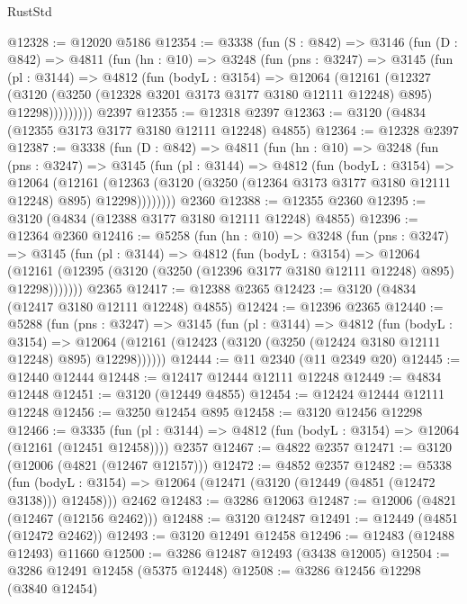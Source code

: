 \begin{lexlean}{RustStd}
\begin{coremodule}
{\begin{coremodule}
{{{{{{{{{{{{{{{{{{{{{{{{{{@12328 := @12020 @5186
@12354 := @3338
    (fun (S : @842) =>
    @3146
      (fun (D : @842) =>
      @4811
        (fun (hn : @10) =>
        @3248
          (fun (pns : @3247) =>
          @3145
            (fun (pl : @3144) =>
            @4812
              (fun (bodyL : @3154) =>
              @12064
                (@12161
                  (@12327
                    (@3120
                      (@3250 (@12328 @3201 @3173 @3177 @3180 @12111 @12248) @895)
                      @12298)))))))))
    @2397
@12355 := @12318 @2397
@12363 := @3120 (@4834 (@12355 @3173 @3177 @3180 @12111 @12248) @4855)
@12364 := @12328 @2397
@12387 := @3338
    (fun (D : @842) =>
    @4811
      (fun (hn : @10) =>
      @3248
        (fun (pns : @3247) =>
        @3145
          (fun (pl : @3144) =>
          @4812
            (fun (bodyL : @3154) =>
            @12064
              (@12161
                (@12363 (@3120 (@3250 (@12364 @3173 @3177 @3180 @12111 @12248) @895) @12298))))))))
    @2360
@12388 := @12355 @2360
@12395 := @3120 (@4834 (@12388 @3177 @3180 @12111 @12248) @4855)
@12396 := @12364 @2360
@12416 := @5258
    (fun (hn : @10) =>
    @3248
      (fun (pns : @3247) =>
      @3145
        (fun (pl : @3144) =>
        @4812
          (fun (bodyL : @3154) =>
          @12064
            (@12161 (@12395 (@3120 (@3250 (@12396 @3177 @3180 @12111 @12248) @895) @12298)))))))
    @2365
@12417 := @12388 @2365
@12423 := @3120 (@4834 (@12417 @3180 @12111 @12248) @4855)
@12424 := @12396 @2365
@12440 := @5288
    (fun (pns : @3247) =>
    @3145
      (fun (pl : @3144) =>
      @4812
        (fun (bodyL : @3154) =>
        @12064 (@12161 (@12423 (@3120 (@3250 (@12424 @3180 @12111 @12248) @895) @12298))))))
@12444 := @11 @2340 (@11 @2349 @20)
@12445 := @12440 @12444
@12448 := @12417 @12444 @12111 @12248
@12449 := @4834 @12448
@12451 := @3120 (@12449 @4855)
@12454 := @12424 @12444 @12111 @12248
@12456 := @3250 @12454 @895
@12458 := @3120 @12456 @12298
@12466 := @3335
    (fun (pl : @3144) => @4812 (fun (bodyL : @3154) => @12064 (@12161 (@12451 @12458))))
    @2357
@12467 := @4822 @2357
@12471 := @3120 (@12006 (@4821 (@12467 @12157)))
@12472 := @4852 @2357
@12482 := @5338
    (fun (bodyL : @3154) => @12064 (@12471 (@3120 (@12449 (@4851 (@12472 @3138))) @12458)))
    @2462
@12483 := @3286 @12063
@12487 := @12006 (@4821 (@12467 (@12156 @2462)))
@12488 := @3120 @12487
@12491 := @12449 (@4851 (@12472 @2462))
@12493 := @3120 @12491 @12458
@12496 := @12483 (@12488 @12493) @11660
@12500 := @3286 @12487 @12493 (@3438 @12005)
@12504 := @3286 @12491 @12458 (@5375 @12448)
@12508 := @3286 @12456 @12298 (@3840 @12454)
}}}}}}}}}}}}}}}}}}}}}}}}}}
\end{coremodule}}
\end{coremodule}
\end{lexlean}
